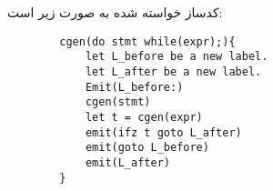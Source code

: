 کدساز خواسته شده به صورت زیر است:
\begin{latin}
	\begin{verbatim}
		cgen(do stmt while(expr);){
		    let L_before be a new label.
		    let L_after be a new label.
		    Emit(L_before:)
		    cgen(stmt)
		    let t = cgen(expr)
		    emit(ifz t goto L_after)
		    emit(goto L_before)
		    emit(L_after)
		}
	\end{verbatim}
\end{latin}